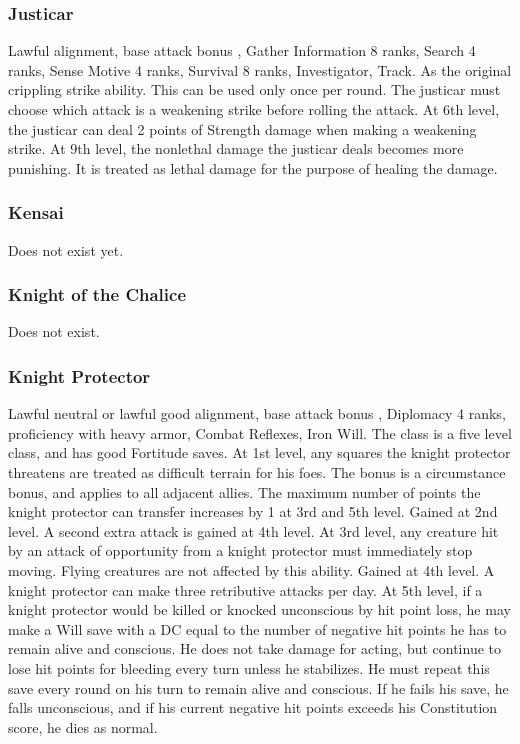 \subsubsection{Justicar}
 Lawful alignment, base attack bonus , Gather Information 8 ranks, Search 4 ranks, Sense Motive 4 ranks, Survival 8 ranks, Investigator, Track.
 As the original crippling strike ability. This can be used only once per round. The justicar must choose which attack is a weakening strike before rolling the attack.
 At 6th level, the justicar can deal 2 points of Strength damage when making a weakening strike.
 At 9th level, the nonlethal damage the justicar deals becomes more punishing. It is treated as lethal damage for the purpose of healing the damage.
\subsubsection{Kensai}
Does not exist yet.
\subsubsection{Knight of the Chalice}
Does not exist.
\subsubsection{Knight Protector}
 Lawful neutral or lawful good alignment, base attack bonus , Diplomacy 4 ranks, proficiency with heavy armor, Combat Reflexes, Iron Will.
 The class is a five level class, and has good Fortitude saves.
 At 1st level, any squares the knight protector threatens are treated as difficult terrain for his foes.
 The bonus is a circumstance bonus, and applies to all adjacent allies. The maximum number of points the knight protector can transfer increases by 1 at 3rd and 5th level.
 Gained at 2nd level. A second extra attack is gained at 4th level.
 At 3rd level, any creature hit by an attack of opportunity from a knight protector must immediately stop moving. Flying creatures are not affected by this ability.
 Gained at 4th level. A knight protector can make three retributive attacks per day.
 At 5th level, if a knight protector would be killed or knocked unconscious by hit point loss, he may make a Will save with a DC equal to the number of negative hit points he has to remain alive and conscious. He does not take damage for acting, but continue to lose hit points for bleeding every turn unless he stabilizes. He must repeat this save every round on his turn to remain alive and conscious. If he fails his save, he falls unconscious, and if his current negative hit points exceeds his Constitution score, he dies as normal.
